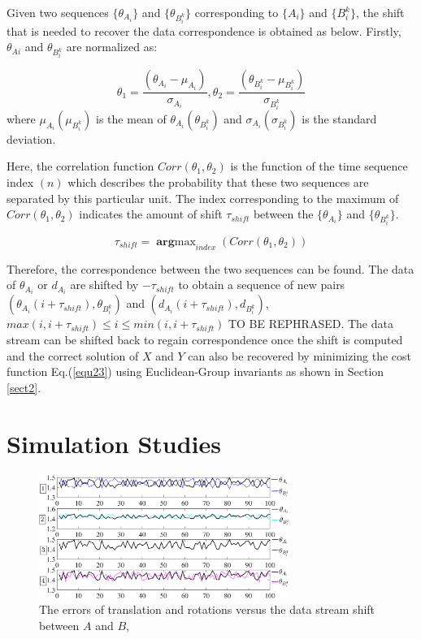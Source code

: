 \documentclass[letterpaper, 10 pt, conference]{ieeeconf}  %
\begin{document}
Given two sequences $\{\theta_{A_{i}}\}$ and $\{\theta_{B_{i}^{k}}\}$ corresponding to  $\{A_{i}\}$ and $\{B_{i}^{k}\}$, the shift that is needed to recover the data correspondence is obtained as below.
Firstly, $\theta_{Ai}$ and $\theta_{B_{i}^{k}}$ are normalized as:

\begin{equation}\label{equ26}
    \theta_{1}=\frac{(\theta_{A_{i}}-\mu_{A_{i}})}{\sigma_{A_{i}}}, \theta_{2}=\frac{(\theta_{B_{i}^{k}}-\mu_{B_{i}^{k}})}{\sigma_{B_{i}^{k}}}
\end{equation}
where $\mu_{A_{i}}(\mu_{B_{i}^{k}})$ is the mean of $\theta_{A_{i}}(\theta_{B_{i}^{k}})$ and $\sigma_{A_{i}}(\sigma_{B_{i}^{k}})$ is the standard deviation.

Here, the correlation function $Corr(\theta_{1},\theta_{2})$  is the function of the time sequence index $(n)$ which describes the probability that these two sequences are separated by this particular unit. The index corresponding to the maximum of $Corr(\theta_{1},\theta_{2})$  indicates the amount of shift $\tau_{shift}$ between the $\{\theta_{A_{i}}\}$ and $\{\theta_{B_{i}^{k}}\}$.

\begin{equation}\label{equ27}
    \tau_{shift} = \mathop{\mathbf{arg}max}_{index}(Corr(\theta_{1},\theta_{2}))
\end{equation}

Therefore, the correspondence between the two sequences can be found. {\color{red}The data of $\theta_{A_{i}}$ or $d_{A_{i}}$ are shifted by $-\tau_{shift}$ to obtain a sequence of new pairs $(\theta_{A_{i}}(i+\tau_{shift}),\theta_{B_{i}^{k}})$ and $(d_{A_{i}}(i+\tau_{shift}),d_{B_{i}^{k}})$, $max(i,i+\tau_{shift})\leq i \leq min(i,i+\tau_{shift})$ TO BE REPHRASED}. The data stream can be shifted back to regain correspondence once the shift is computed and the correct solution of $X$ and $Y$ can also be recovered by minimizing the cost function Eq.(\ref{equ23}) using Euclidean-Group invariants as shown in Section \ref{sect2}.


\section{Simulation Studies}
\label{sect4}

\begin{center}
\begin{figure}
\centering
\includegraphics[width=3.2in]{fig2.eps}
\caption{
The errors of translation and rotations versus the data stream shift between $A$ and $B$,
}
\label{fig2}
\end{figure}
\end{center}
\end{document}

